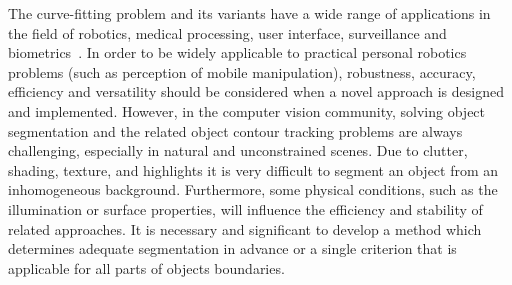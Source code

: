 \documentclass[conference]{IEEEtran}
\begin{document}
The curve-fitting problem and its variants have a wide range of
applications in the field of robotics, medical processing, user
interface, surveillance and biometrics~\cite{hanek2004fitting}. In order to be
widely applicable to practical personal robotics problems (such as
perception of mobile manipulation), robustness,
accuracy, efficiency and versatility should be
considered when a novel approach is designed and implemented.
However, in the computer vision community, solving object segmentation and the
related object contour tracking problems are always challenging,
especially in natural and unconstrained scenes. Due to clutter,
shading, texture, and highlights it is very difficult to segment
an object from an inhomogeneous background. Furthermore, some physical
conditions, such as the illumination or surface properties, will
influence the efficiency and stability of related approaches. It is
necessary and significant to develop a method which determines adequate segmentation
in advance or a single criterion that is applicable for all parts of objects boundaries.
\end{document}
